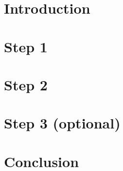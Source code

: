 \documentclass[english,11pt]{article}
\begin{document}
\onehalfspacing


\tableofcontents
\newpage

\section{Introduction}

\newpage

\section{Step 1}

\newpage

\section{Step 2}

\newpage

\section{Step 3 (optional)}



\section{Conclusion}

\end{document}
